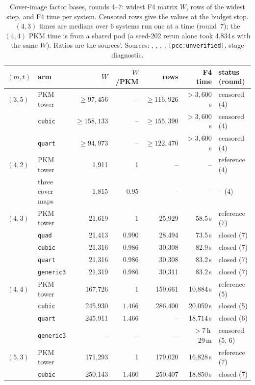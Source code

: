 \begin{table}[t]
\centering\footnotesize
\begin{tabular}{@{}llrrrrl@{}}
\toprule
$(m,t)$ & arm & $W$ & $W$/PKM & rows & F4 time & status (round) \\
\midrule
$(3,5)$ & PKM tower & $\ge97{,}456$ & -- & $\ge116{,}926$ & $>3{,}600$\,s & censored (4) \\
 & \texttt{cubic} & $\ge158{,}133$ & -- & $\ge155{,}390$ & $>3{,}600$\,s & censored (4) \\
 & \texttt{quart} & $\ge94{,}973$ & -- & $\ge122{,}470$ & $>3{,}600$\,s & censored (4) \\
\addlinespace
$(4,2)$ & PKM tower & 1{,}911 & 1 & -- & -- & reference (4) \\
 & three cover maps & 1{,}815 & $0.95$ & -- & -- & -- (4) \\
\addlinespace
$(4,3)$ & PKM tower & 21{,}619 & 1 & 25{,}929 & 58.5\,s & reference (7) \\
 & \texttt{quad} & 21{,}413 & $0.990$ & 28{,}494 & 73.5\,s & closed (7) \\
 & \texttt{cubic} & 21{,}316 & $0.986$ & 30{,}308 & 82.9\,s & closed (7) \\
 & \texttt{quart} & 21{,}316 & $0.986$ & 30{,}308 & 83.2\,s & closed (7) \\
 & \texttt{generic3} & 21{,}319 & $0.986$ & 30{,}311 & 83.2\,s & closed (7) \\
\addlinespace
$(4,4)$ & PKM tower & 167{,}726 & 1 & 159{,}661 & 10{,}884\,s & reference (5) \\
 & \texttt{cubic} & 245{,}930 & $1.466$ & 286{,}400 & 20{,}059\,s & closed (5) \\
 & \texttt{quart} & 245{,}911 & $1.466$ & -- & 18{,}714\,s & closed (6) \\
 & \texttt{generic3} & -- & -- & -- & $>7$\,h\,29\,m & censored (5, 6) \\
\addlinespace
$(5,3)$ & PKM tower & 171{,}293 & 1 & 179{,}020 & 16{,}828\,s & reference (7) \\
 & \texttt{cubic} & 250{,}143 & $1.460$ & 250{,}407 & 18{,}850\,s & closed (7) \\
\bottomrule
\end{tabular}
\caption[]{Cover-image factor bases, rounds 4--7: widest F4 matrix $W$,
rows of the widest step, and F4 time per system. Censored rows give the
values at the budget stop. $(4,3)$ times are medians over 6 systems run one
at a time (round~7); the $(4,4)$ PKM time is from a shared pod (a seed-202
rerun alone took 4{,}834\,s with the same $W$). Ratios are the sources'.
Sources: ,
,
,
;
\texttt{[pcc:unverified]}, stage diagnostic.}
\label{tab:cover-image-fb-r47}
\end{table}

